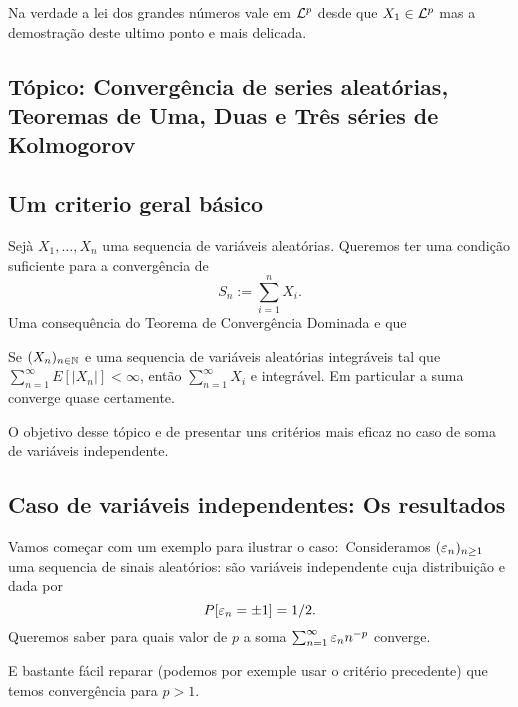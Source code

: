 \begin{remark}
 Na verdade a lei dos grandes números vale em ${\mathcal L}^p$ desde que $X_1\in {\ensuremath{\mathcal L}}^p$ mas a demostração deste ultimo ponto e mais delicada.
\end{remark}

\newpage
\begin{topics}
\section[Tópico:Séries de Kolmogorov]{Tópico: Convergência de series aleatórias,\\
Teoremas de Uma, Duas e Três séries de Kolmogorov}


\subsection{Um criterio geral básico}

Sejà $X_1,\dots, X_n$ uma sequencia de variáveis aleatórias.
Queremos ter uma condição suficiente para a convergência de
\begin{equation}
S_n:= \sum_{i=1}^n X_i.
\end{equation}
Uma consequência do Teorema de Convergência Dominada e que
\begin{lemma}
 Se $(X_n)_{n\in {\ensuremath{\mathbb N}}}$ e uma sequencia de variáveis aleatórias integráveis tal que
 $\sum_{n=1}^{\infty} E[ |X_n| ]<\infty$,
então $\sum_{n=1}^{\infty} X_i$ e integrável.
Em particular a suma converge quase certamente.
\end{lemma}

O objetivo desse tópico e de presentar uns critérios mais eficaz no caso de soma de variáveis independente.

\medskip

\subsection{Caso de variáveis independentes: Os resultados}

Vamos começar com um exemplo para ilustrar o caso:\
Consideramos $(\varepsilon_n)_{n\ge 1}$ uma sequencia de sinais aleatórios: são variáveis independente cuja distribuição e dada por
$$P[\varepsilon_n=\pm 1]=1/2.$$
Queremos saber para quais valor de $p$ a soma $\sum_{n=1}^{\infty} \varepsilon_n n^{-p}$ converge.

\medskip

E bastante fácil reparar (podemos por exemple usar o critério precedente) que temos convergência para $p>1$.


\end{topics}

